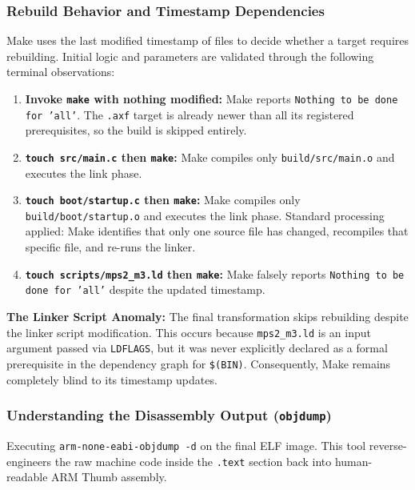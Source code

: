 \subsubsection{Rebuild Behavior and Timestamp Dependencies}
Make uses the last modified timestamp of files to decide whether a target requires rebuilding. Initial logic and parameters are validated through the following terminal observations:

\begin{enumerate}
    \item \textbf{Invoke \texttt{make} with nothing modified:} 
    Make reports \texttt{Nothing to be done for 'all'}. The \texttt{.axf} target is already newer than all its registered prerequisites, so the build is skipped entirely.
    
    \item \textbf{\texttt{touch src/main.c} then \texttt{make}:} 
    Make compiles only \texttt{build/src/main.o} and executes the link phase.
    
    \item \textbf{\texttt{touch boot/startup.c} then \texttt{make}:} 
    Make compiles only \texttt{build/boot/startup.o} and executes the link phase. Standard processing applied: Make identifies that only one source file has changed, recompiles that specific file, and re-runs the linker.
    
    \item \textbf{\texttt{touch scripts/mps2\_m3.ld} then \texttt{make}:} 
    Make falsely reports \texttt{Nothing to be done for 'all'} despite the updated timestamp.
\end{enumerate}

\textbf{The Linker Script Anomaly:} The final transformation skips rebuilding despite the linker script modification. This occurs because \texttt{mps2\_m3.ld} is an input argument passed via \texttt{LDFLAGS}, but it was never explicitly declared as a formal prerequisite in the dependency graph for \texttt{\$(BIN)}. Consequently, Make remains completely blind to its timestamp updates.

\subsubsection{Understanding the Disassembly Output (\texttt{objdump})}
Executing \texttt{arm-none-eabi-objdump -d} on the final ELF image. This tool reverse-engineers the raw machine code inside the \texttt{.text} section back into human-readable ARM Thumb assembly. 

